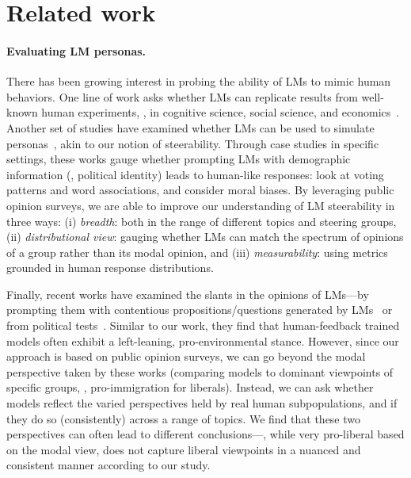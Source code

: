 \section{Related work}
\label{sec:related}

\paragraph{Evaluating LM personas.}
There has been growing interest in probing the ability of LMs to mimic human behaviors.
One line of work asks whether LMs can replicate results from well-known human experiments, \eg, in cognitive science, social science, and economics~\citep{uchendu2021turingbench,karra2022ai,aher2022using,binz2022using,srivastava2022beyond}.
Another set of studies have examined whether LMs can be used to simulate personas~\citep{park2022social,argyle2022out,jiang2022communitylm,simmons2022moral}, akin to our notion of steerability.
Through case studies in specific settings, these works gauge whether prompting LMs with demographic information (\eg, political identity) leads to human-like responses: \citet{argyle2022out} look at voting patterns and word associations, and \citet{simmons2022moral} consider moral biases.
By leveraging public opinion surveys, we are able to improve our understanding of LM steerability in three ways: (i)  \emph{breadth}: both in the range of different topics and steering groups, (ii) \emph{distributional view}: gauging whether LMs can match the spectrum of opinions of a group rather than its modal opinion, and (iii) \emph{measurability}: using metrics grounded in human response distributions.

Finally, recent works have examined the slants in the opinions of LMs---by prompting them with contentious propositions/questions generated by LMs~\citet{perez2022discovering} or from political tests~\citet{hartmann2023political}.
Similar to our work, they find that human-feedback trained models often exhibit a left-leaning, pro-environmental stance.
However, since our approach is based on public opinion surveys, we can go beyond the modal perspective taken by these works (comparing models to dominant viewpoints of specific groups, \eg, pro-immigration for liberals).
Instead, we can ask whether models reflect the varied perspectives held by real human subpopulations, and if they do so (consistently) across a range of topics.
We find that these two perspectives can often lead to different conclusions---\eg,  while very pro-liberal based on the modal view, does not capture liberal viewpoints in a nuanced and consistent manner according to our study. 


